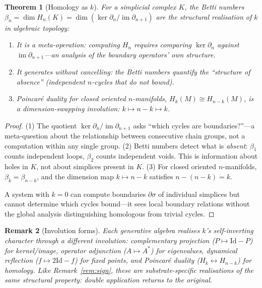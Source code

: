 \documentclass[11pt,a4paper]{article}
\newtheorem{theorem}{Theorem}
\newtheorem{remark}[theorem]{Remark}
\newcommand{\recu}[1]{{\color{kcolor}#1}}
\def\recu#1{#1}%
\begin{document}
\begin{theorem}[Homology as $\recu{k}$]
\label{thm:homology}
For a simplicial complex $K$, the Betti numbers
$\beta_n = \dim H_n(K) = \dim(\ker\partial_n /
\operatorname{im}\partial_{n+1})$ are the structural realisation of
$\recu{k}$ in algebraic topology:
\begin{enumerate}[nosep]
  \item It is a meta-operation: computing $H_n$ requires comparing
    $\ker\partial_n$ against $\operatorname{im}\partial_{n+1}$---an
    analysis of the boundary operators' own structure.
  \item It generates without cancelling: the Betti numbers quantify
    the ``structure of absence'' (independent $n$-cycles that do not
    bound).
  \item Poincar\'e duality for closed oriented $n$-manifolds,
    $H_k(M) \cong H_{n-k}(M)$, is a dimension-swapping involution:
    $k \mapsto n-k \mapsto k$.
\end{enumerate}
\end{theorem}

\begin{proof}
(1) The quotient $\ker\partial_n / \operatorname{im}\partial_{n+1}$
asks ``which cycles are boundaries?''---a meta-question about the
relationship between consecutive chain groups, not a computation
within any single group. (2) Betti numbers detect what is
\emph{absent}: $\beta_1$ counts independent loops, $\beta_2$ counts
independent voids. This is information about holes in $K$, not about
simplices present in $K$. (3) For closed oriented $n$-manifolds,
$\beta_k = \beta_{n-k}$, and the dimension map $k \mapsto n-k$
satisfies $n - (n-k) = k$.

A system with $k = 0$ can compute boundaries $\partial\sigma$ of
individual simplices but cannot determine which cycles bound---it sees
local boundary relations without the global analysis distinguishing
homologous from trivial cycles.
\end{proof}

\begin{remark}[Involution forms]
\label{rem:involution-forms}
Each generative algebra realises $\recu{k}$'s self-inverting character
through a different involution:
complementary projection ($P \mapsto \mathrm{Id} - P$) for
kernel/image,
operator adjunction ($A \mapsto A^*$) for eigenvalues,
dynamical reflection ($f \mapsto 2\mathrm{Id} - f$) for fixed points,
and Poincar\'e duality ($H_k \leftrightarrow H_{n-k}$) for homology.
Like Remark~\ref{rem:sign}, these are substrate-specific realisations
of the same structural property: double application returns to the
original.
\end{remark}
\end{document}
